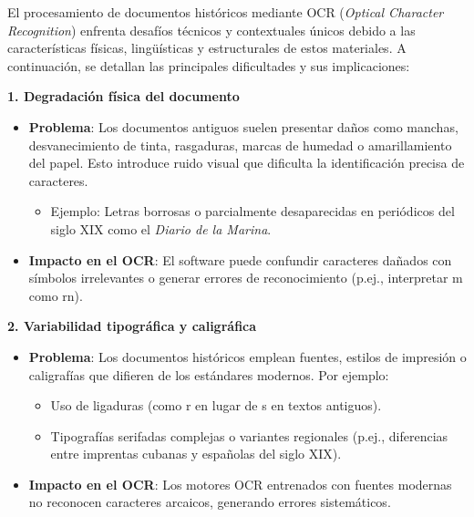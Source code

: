 El procesamiento de documentos históricos mediante OCR (\textit{Optical Character Recognition}) enfrenta desafíos técnicos y contextuales únicos debido a las características físicas, lingüísticas y estructurales de estos materiales. A continuación, se detallan las principales dificultades y sus implicaciones:

\textbf{1. Degradación física del documento}
\begin{itemize}
	\item \textbf{Problema}:  
	Los documentos antiguos suelen presentar daños como manchas, desvanecimiento de tinta, rasgaduras, marcas de humedad o amarillamiento del papel. Esto introduce ruido visual que dificulta la identificación precisa de caracteres.  
	\begin{itemize}
		\item Ejemplo: Letras borrosas o parcialmente desaparecidas en periódicos del siglo XIX como el \textit{Diario de la Marina}.  
	\end{itemize}
	
	\item \textbf{Impacto en el OCR}:  
	El software puede confundir caracteres dañados con símbolos irrelevantes o generar errores de reconocimiento (p.ej., interpretar m como rn).
\end{itemize}

\textbf{2. Variabilidad tipográfica y caligráfica}
\begin{itemize}
	\item \textbf{Problema}:  
	Los documentos históricos emplean fuentes, estilos de impresión o caligrafías que difieren de los estándares modernos. Por ejemplo:  
	\begin{itemize}
		\item Uso de ligaduras (como r en lugar de s en textos antiguos).  
		\item Tipografías serifadas complejas o variantes regionales (p.ej., diferencias entre imprentas cubanas y españolas del siglo XIX).  
	\end{itemize}
	
	\item \textbf{Impacto en el OCR}:  
	Los motores OCR entrenados con fuentes modernas no reconocen caracteres arcaicos, generando errores sistemáticos.
\end{itemize}

